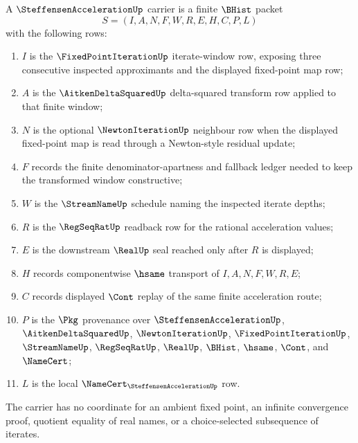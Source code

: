 \begin{definition}
\label{def:steffensen-acceleration-carrier}
A $\SteffensenAccelerationUp$ carrier is a finite $\BHist$ packet
$$
S=(I,A,N,F,W,R,E,H,C,P,L)
$$
with the following rows:
\begin{enumerate}
\item $I$ is the $\FixedPointIterationUp$ iterate-window row, exposing three consecutive inspected approximants and the displayed fixed-point map row;
\item $A$ is the $\AitkenDeltaSquaredUp$ delta-squared transform row applied to that finite window;
\item $N$ is the optional $\NewtonIterationUp$ neighbour row when the displayed fixed-point map is read through a Newton-style residual update;
\item $F$ records the finite denominator-apartness and fallback ledger needed to keep the transformed window constructive;
\item $W$ is the $\StreamNameUp$ schedule naming the inspected iterate depths;
\item $R$ is the $\RegSeqRatUp$ readback row for the rational acceleration values;
\item $E$ is the downstream $\RealUp$ seal reached only after $R$ is displayed;
\item $H$ records componentwise $\hsame$ transport of $I,A,N,F,W,R,E$;
\item $C$ records displayed $\Cont$ replay of the same finite acceleration route;
\item $P$ is the $\Pkg$ provenance over $\SteffensenAccelerationUp$, $\AitkenDeltaSquaredUp$, $\NewtonIterationUp$, $\FixedPointIterationUp$, $\StreamNameUp$, $\RegSeqRatUp$, $\RealUp$, $\BHist$, $\hsame$, $\Cont$, and $\NameCert$;
\item $L$ is the local $\NameCert_{\SteffensenAccelerationUp}$ row.
\end{enumerate}
The carrier has no coordinate for an ambient fixed point, an infinite convergence proof, quotient equality of real names, or a choice-selected subsequence of iterates.
\end{definition}

